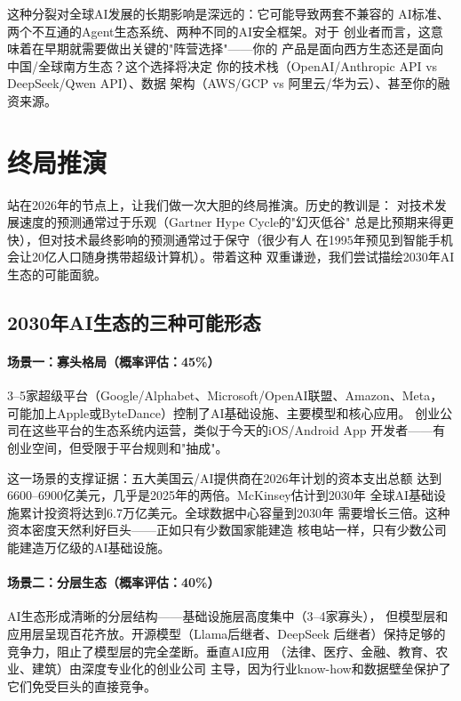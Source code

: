 这种分裂对全球AI发展的长期影响是深远的：它可能导致两套不兼容的
AI标准、两个不互通的Agent生态系统、两种不同的AI安全框架。对于
创业者而言，这意味着在早期就需要做出关键的"阵营选择"——你的
产品是面向西方生态还是面向中国/全球南方生态？这个选择将决定
你的技术栈（OpenAI/Anthropic API vs DeepSeek/Qwen API）、数据
架构（AWS/GCP vs 阿里云/华为云）、甚至你的融资来源。


\section{终局推演}
\label{sec:outlook-endgame}

站在2026年的节点上，让我们做一次大胆的终局推演。历史的教训是：
对技术发展速度的预测通常过于乐观（Gartner Hype Cycle的"幻灭低谷"
总是比预期来得更快），但对技术最终影响的预测通常过于保守（很少有人
在1995年预见到智能手机会让20亿人口随身携带超级计算机）。带着这种
双重谦逊，我们尝试描绘2030年AI生态的可能面貌。


\subsection{2030年AI生态的三种可能形态}
\label{subsec:outlook-three-scenarios}

\paragraph{场景一：寡头格局（概率评估：45\%）}
3--5家超级平台（Google/Alphabet、Microsoft/OpenAI联盟、Amazon、Meta，
可能加上Apple或ByteDance）控制了AI基础设施、主要模型和核心应用。
创业公司在这些平台的生态系统内运营，类似于今天的iOS/Android App
开发者——有创业空间，但受限于平台规则和"抽成"。

这一场景的支撑证据：五大美国云/AI提供商在2026年计划的资本支出总额
达到6600--6900亿美元，几乎是2025年的两倍。McKinsey估计到2030年
全球AI基础设施累计投资将达到6.7万亿美元。全球数据中心容量到2030年
需要增长三倍。这种资本密度天然利好巨头——正如只有少数国家能建造
核电站一样，只有少数公司能建造万亿级的AI基础设施。

\paragraph{场景二：分层生态（概率评估：40\%）}
AI生态形成清晰的分层结构——基础设施层高度集中（3--4家寡头），
但模型层和应用层呈现百花齐放。开源模型（Llama后继者、DeepSeek
后继者）保持足够的竞争力，阻止了模型层的完全垄断。垂直AI应用
（法律、医疗、金融、教育、农业、建筑）由深度专业化的创业公司
主导，因为行业know-how和数据壁垒保护了它们免受巨头的直接竞争。

